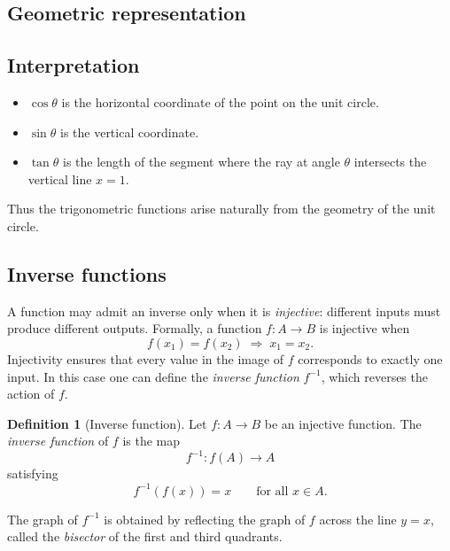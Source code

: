 \documentclass[11pt,a4paper]{article}
\theoremstyle{definition} \newtheorem{definition}{Definition} \theoremstyle{plain} \newtheorem{theorem}{Theorem}
\begin{document}
\subsection{Geometric representation}
\begin{center}  \end{center}
\subsection{Interpretation}
\begin{itemize}
\item $\cos\theta$ is the horizontal coordinate of the point on the unit circle.
\item $\sin\theta$ is the vertical coordinate.
\item $\tan\theta$ is the length of the segment where the ray at angle $\theta$
intersects the vertical line $x=1$. \end{itemize}
Thus the trigonometric functions arise naturally from the geometry of the unit circle.
\subsection{Inverse functions}
A function may admit an inverse only when it is \emph{injective}: different inputs must produce different outputs.
Formally, a function $f : A \to B$ is injective when
\[ f(x_1)=f(x_2) \;\Rightarrow\; x_1=x_2. \]
Injectivity ensures that every value in the image of $f$ corresponds to exactly one input.
In this case one can define the \emph{inverse function} $f^{-1}$, which reverses the action of $f$.
\begin{definition}[Inverse function] Let $f : A \to B$ be an injective function.
The \emph{inverse function} of $f$ is the map
\[ f^{-1} : f(A) \to A \]
satisfying
\[\boxed{ f^{-1}(f(x)) = x \qquad \text{for all } x\in A. }\]
\end{definition}
The graph of $f^{-1}$ is obtained by reflecting the graph of $f$ across the line $y=x$, called the \emph{bisector} of the first and third quadrants.
\end{document}
